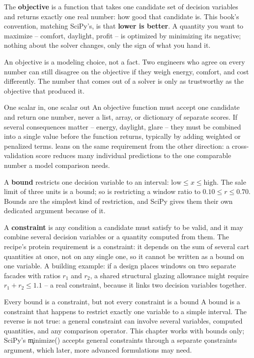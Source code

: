 
The \textbf{objective} is a function that takes one candidate set of decision
variables and returns exactly one real number: how good that candidate is. This
book's convention, matching SciPy's, is that \textbf{lower is better}. A
quantity you want to maximize -- comfort, daylight, profit -- is optimized by
minimizing its negative; nothing about the solver changes, only the sign of
what you hand it.

An objective is a modeling choice, not a fact. Two engineers who agree on every
number can still disagree on the objective if they weigh energy, comfort, and
cost differently. The number that comes out of a solver is only as trustworthy
as the objective that produced it.

\begin{ExplainBox}{One scalar in, one scalar out}
An objective function must accept one candidate and return one number, never a
list, array, or dictionary of separate scores. If several consequences matter
-- energy, daylight, glare -- they must be combined into a single value before
the function returns, typically by adding weighted or penalized terms.
 leans on the same requirement from the other
direction: a cross-validation score reduces many individual predictions to
the one comparable number a model comparison needs.
\end{ExplainBox}


A \textbf{bound} restricts one decision variable to an interval:
$\text{low} \le x \le \text{high}$. The sale limit of three units is a bound;
so is restricting a window ratio to $0.10 \le r \le 0.70$. Bounds are the
simplest kind of restriction, and SciPy gives them their own dedicated
argument because of it.

A \textbf{constraint} is any condition a candidate must satisfy to be valid,
and it may combine several decision variables or a quantity computed from
them. The recipe's protein requirement is a constraint: it depends on the sum
of several cart quantities at once, not on any single one, so it cannot be
written as a bound on one variable. A building example: if a design places
windows on two separate facades with ratios $r_1$ and $r_2$, a shared
structural glazing allowance might require $r_1 + r_2 \le 1.1$ -- a real
constraint, because it links two decision variables together.

\begin{ExplainBox}{Every bound is a constraint, but not every constraint is a bound}
A bound is a constraint that happens to restrict exactly one variable to a
simple interval. The reverse is not true: a general constraint can involve
several variables, computed quantities, and any comparison operator. This
chapter works with bounds only; SciPy's \c{minimize()} accepts general
constraints through a separate \c{constraints} argument, which later,
more advanced formulations may need.
\end{ExplainBox}

